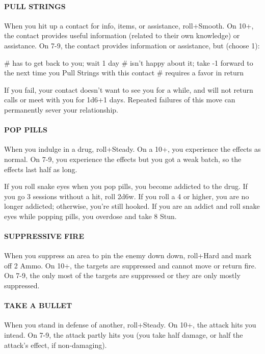 \paragraph{PULL STRINGS}
When you hit up a contact for info, items, or assistance, roll+Smooth. On 10+, the contact provides useful information (related to their own knowledge) or assistance. On 7-9, the contact provides information or assistance, but (choose 1):
\begin{easylist}
    # has to get back to you; wait 1 day
    # isn’t happy about it; take -1 forward to the next time you Pull Strings with this contact
    # requires a favor in return
\end{easylist}
If you fail, your contact doesn’t want to see you for a while, and will not return calls or meet with you for 1d6+1 days. Repeated failures of this move can permanently sever your relationship.

\paragraph{POP PILLS}
When you indulge in a drug, roll+Steady. On a 10+, you experience the effects as normal. On 7-9, you experience the effects but you got a weak batch, so the effects last half as long.

If you roll snake eyes when you pop pills, you become addicted to the drug. If you go 3 sessions without a hit, roll 2d6w. If you roll a 4 or higher, you are no longer addicted; otherwise, you’re still hooked. If you are an addict and roll snake eyes while popping pills, you overdose and take 8 Stun.


\paragraph{SUPPRESSIVE FIRE}
When you suppress an area to pin the enemy down down, roll+Hard and mark off 2 Ammo. On 10+, the targets are suppressed and cannot move or return fire. On 7-9, the only most of the targets are suppressed or they are only mostly suppressed.

\paragraph{TAKE A BULLET}
When you stand in defense of another, roll+Steady. On 10+, the attack hits you intead. On 7-9, the attack partly hits you (you take half damage, or half the attack’s effect, if non-damaging).




